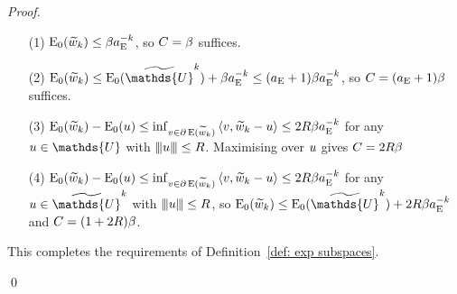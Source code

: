 \documentclass[smallextended]{svjour3}
\let\F\mathds\let\C\mathcal\newcommand{\R}{\F{R}}\newcommand{\A}{\tens{A}}
\newcommand{\Norm}[1]{{\left\vert\kern-0.25ex\left\vert\kern-0.25ex\left\vert #1 \right\vert\kern-0.25ex\right\vert\kern-0.25ex\right\vert}}
\newcommand{\IP}[2]{\left\langle #1,#2 \right\rangle}
\newcommand{\op}[1]{\operatorname{#1}}
\newcommand{\1}{\F{1}}
\newcommand*{\var}[1]{%
	\IfEqCase{#1}{%
		{0}{u}%
		{1}{v}%
		{2}{w}%
	}[u#1]%
}
\newcommand*{\vars}[1]{%
	\IfEqCase{#1}{%
		{0}{\alpha}%
		{1}{\beta}%
		{2}{\gamma}%
		{3}{a}%
		{4}{b}%
		{5}{c}%
	}[k#1]%
}
\begin{document}
\begin{proof}
{			\begin{itemize}
				\item[(1)] $\op{E}_0(\tilde{\var2}_k)\leq \vars1\aE^{-k}$, so $C=\vars1$ suffices.
				\item[(2)] $\op{E}_0(\tilde{\var2}_k)\leq \op{E}_0(\tilde{\F{U}}^k) + \vars1\aE^{-k} \leq (\aE +1)\beta\aE^{-k}$, so $C=(\aE +1)\beta$ suffices.
				\item[(3)] $\op{E}_0(\tilde{\var2}_k)-\op{E}_0(\var0)\leq \inf_{\var1\in\partial\op{E}(\tilde{\var2}_k)}\IP{\var1}{\tilde{\var2}_k-\var0}\leq 2R\vars1\aE^{-k}$ for any $\var0\in\F{U}$ with $\Norm{\var0}\leq R$. Maximising over $\var0$ gives $C=2R\vars1$
				\item[(4)] $\op{E}_0(\tilde{\var2}_k)-\op{E}_0(\var0)\leq \inf_{\var1\in\partial\op{E}(\tilde{\var2}_k)}\IP{\var1}{\tilde{\var2}_k-\var0}\leq 2R\vars1\aE^{-k}$ for any $\var0\in\tilde{\F{U}}^k$ with $\Norm{\var0}\leq R$, so $\op{E}_0(\tilde{\var2}_k) \leq \op{E}_0(\tilde{\F{U}}^k) + 2R\vars1\aE^{-k}$ and $C=(1+2R)\vars1$.
			\end{itemize}
			This completes the requirements of Definition~\ref{def: exp subspaces}.
		}
		\qed\end{proof}
	
	
\end{document}
